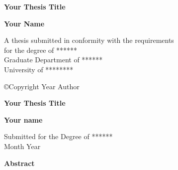 
\setcounter{page}{1}

\thispagestyle{empty}

\singlespacing

\begin{center}



\vspace*{0.5in}  

                          {\Large \bf Your Thesis Title}

  
  			     \vspace*{1.3in}
 

                          {\Large \bf Your Name}\\
  
  			     \vspace*{3.5in}
  
 
         {\large 
         A thesis submitted in conformity with the requirements \\
                    for the degree of ******\\
                    Graduate Department of ******\\
                    University of ********\\
         } 
     				\vfill
 
		\copyright Copyright Year Author

\end{center}

\cleardoublepage



\begin{center}  
  	\textbf{ \large Your Thesis Title}

		       \vspace*{1cm}

  		\textbf{\large Your name}

  		       \vspace*{0.5cm}
  
      {\large Submitted for the Degree of ******}\\[0.2in] 

                           Month Year   

  			\vspace*{1cm}
  		 
		 \textbf{\large Abstract}
\end{center}

